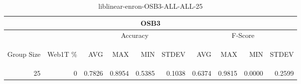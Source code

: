 \begin{center}
\begin{table}[htbp] 
 \begin{center}
\begin{tabular}{ | r | r | r | r | r | r | r | r | r | r |}
\hline
\multicolumn{10}{|c|}{OSB3}\\
\hline
 & & \multicolumn{4}{|c|}{Accuracy} & \multicolumn{4}{|c|}{F-Score}\\ \cline{3-10}
\begin{sideways}Group Size\end{sideways} & \begin{sideways}Web1T \%\end{sideways} & \begin{sideways}AVG\end{sideways} & \begin{sideways}MAX\end{sideways} & \begin{sideways}MIN\end{sideways} & \begin{sideways}STDEV\end{sideways} & \begin{sideways}AVG\end{sideways} & \begin{sideways}MAX\end{sideways} & \begin{sideways}MIN\end{sideways} & \begin{sideways}STDEV\end{sideways}\\
\hline
\multirow{0}{*}{25}
 & 0 & 0.7826 & 0.8954 & 0.5385 & 0.1038 & 0.6374 & 0.9815 & 0.0000 & 0.2599\\ \cline{2-10}
\hline
\end{tabular}
\caption{liblinear-enron-OSB3-ALL-ALL-25}
\label{table:liblinear-enron-OSB3-ALL-ALL-25}
\end{center}
 \end{table}
\end{center}

